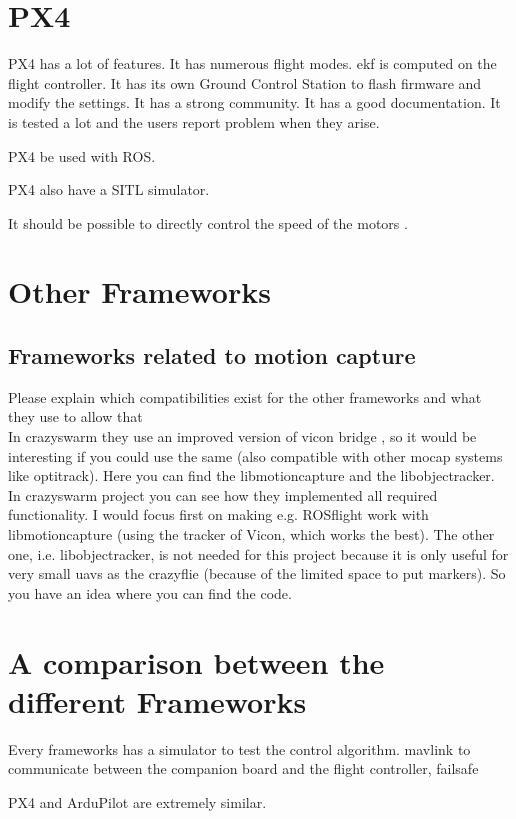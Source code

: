 \section{PX4}
PX4 has a lot of features.
It has numerous flight modes.
\Gls{ekf} is computed on the flight controller.
It has its own Ground Control Station to flash firmware and modify the settings.
It has a strong community.
It has a good documentation.
It is tested a lot and the users report problem when they arise.

PX4 be used  with ROS.

PX4 also have a SITL simulator.

It should be possible to directly control the speed of the motors \cite{px4_low_level_control}.


\section{Other Frameworks}
\subsection{Frameworks related to motion capture}
{\color{red}Please explain which compatibilities exist for the other frameworks and what they use to allow that \\}
{\color{red}In crazyswarm they use an improved version of vicon bridge \cite{ros_wiki_vicon_bridge}, so it would be interesting if you could use the same (also compatible with other mocap systems like optitrack). Here \cite{github_usc_actlab} you can find the libmotioncapture and the libobjectracker. In crazyswarm project you can see how they implemented all required functionality. I would focus first on making e.g. ROSflight work with libmotioncapture (using the tracker of Vicon, which works the best). The other one, i.e. libobjectracker, is not needed for this project because it is only useful for very small uavs as the crazyflie (because of the limited space to put markers). So you have an idea where you can find the code.\\}

\section{A comparison between the different Frameworks}
Every frameworks has a simulator to test the control algorithm.
mavlink to communicate between the companion board and the flight controller, failsafe

PX4 and ArduPilot are extremely similar.

